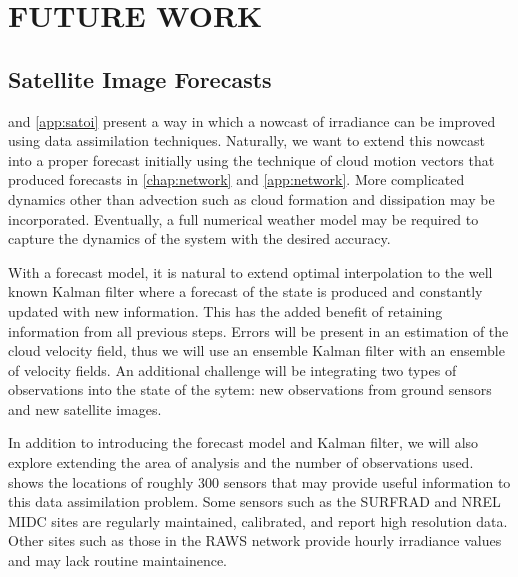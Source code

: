\chapter{FUTURE WORK}
\label{chap:satfx}



\section{Satellite Image Forecasts}
\label{sec:satellite_fx}

 and \cref{app:satoi} present a way in which a
nowcast of irradiance can be improved using data assimilation
techniques.
Naturally, we want to extend this nowcast into a proper forecast
initially using the technique of cloud motion vectors that produced
forecasts in \cref{chap:network} and \cref{app:network}.
More complicated dynamics other than advection such as cloud formation
and dissipation may be incorporated.
Eventually, a full numerical weather model may be required to capture
the dynamics of the system with the desired accuracy.


With a forecast model, it is natural to extend optimal interpolation
to the well known Kalman filter where a forecast of the state is
produced and constantly updated with new information.
This has the added benefit of retaining information from all previous
steps.
Errors will be present in an estimation of the cloud velocity field,
thus we will use an ensemble Kalman filter with an ensemble of
velocity fields.
An additional challenge will be integrating two types of observations
into the state of the sytem: new observations from ground sensors and
new satellite images.


In addition to introducing the forecast model and Kalman filter, we
will also explore extending the area of analysis and the number of
observations used.
 shows the locations of roughly 300 sensors that
may provide useful information to this data assimilation problem.
Some sensors such as the SURFRAD and NREL MIDC sites are regularly
maintained, calibrated, and report high resolution data.
Other sites such as those in the RAWS network provide hourly
irradiance values and may lack routine maintainence.


